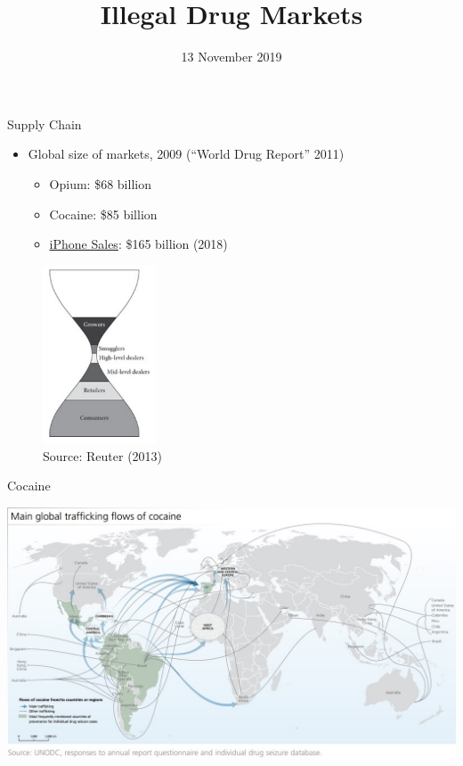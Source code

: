 \documentclass[10pt,ignorenonframetext,]{beamer}
\title{Illegal Drug Markets}
\date{13 November 2019}
\providecommand{\tightlist}{%
  \setlength{\itemsep}{0pt}\setlength{\parskip}{0pt}}
\begin{document}
\frame{\titlepage}

\begin{frame}{Supply Chain}
\protect\hypertarget{supply-chain}{}

\begin{itemize}
\tightlist
\item
  Global size of markets, 2009 (``World Drug Report'' 2011)

  \begin{itemize}
  \tightlist
  \item
    Opium: \$68 billion
  \item
    Cocaine: \$85 billion
  \item
    \href{https://www.statista.com/statistics/263402/apples-iphone-revenue-since-3rd-quarter-2007/}{iPhone
    Sales}: \$165 billion (2018)
  \end{itemize}
\end{itemize}

\begin{figure}
\centering
\includegraphics[width=0.3\textwidth,height=\textheight]{../chicago/figs/Reuter_hourglass.png}
\caption{Source: Reuter (2013)}
\end{figure}

\end{frame}

\begin{frame}{Cocaine}
\protect\hypertarget{cocaine}{}

\includegraphics{../chicago/figs/cocaine_supply_map.jpg}

\end{frame}
\end{document}
